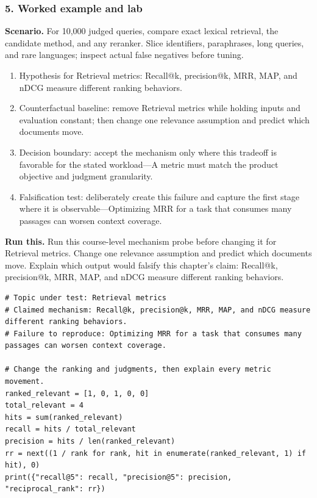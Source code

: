 \subsubsection*{5. Worked example and lab}
\textbf{Scenario.} For 10,000 judged queries, compare exact lexical retrieval, the candidate method, and any reranker. Slice identifiers, paraphrases, long queries, and rare languages; inspect actual false negatives before tuning.
\begin{enumerate}
\item Hypothesis for Retrieval metrics: Recall@k, precision@k, MRR, MAP, and nDCG measure different ranking behaviors.
\item Counterfactual baseline: remove Retrieval metrics while holding inputs and evaluation constant; then change one relevance assumption and predict which documents move.
\item Decision boundary: accept the mechanism only where this tradeoff is favorable for the stated workload—A metric must match the product objective and judgment granularity.
\item Falsification test: deliberately create this failure and capture the first stage where it is observable—Optimizing MRR for a task that consumes many passages can worsen context coverage.
\end{enumerate}
\textbf{Run this.} Run this course-level mechanism probe before changing it for Retrieval metrics. Change one relevance assumption and predict which documents move. Explain which output would falsify this chapter's claim: Recall@k, precision@k, MRR, MAP, and nDCG measure different ranking behaviors.
\begin{Verbatim}[fontsize=\scriptsize]
# Topic under test: Retrieval metrics
# Claimed mechanism: Recall@k, precision@k, MRR, MAP, and nDCG measure different ranking behaviors.
# Failure to reproduce: Optimizing MRR for a task that consumes many passages can worsen context coverage.

# Change the ranking and judgments, then explain every metric movement.
ranked_relevant = [1, 0, 1, 0, 0]
total_relevant = 4
hits = sum(ranked_relevant)
recall = hits / total_relevant
precision = hits / len(ranked_relevant)
rr = next((1 / rank for rank, hit in enumerate(ranked_relevant, 1) if hit), 0)
print({"recall@5": recall, "precision@5": precision, "reciprocal_rank": rr})
\end{Verbatim}
